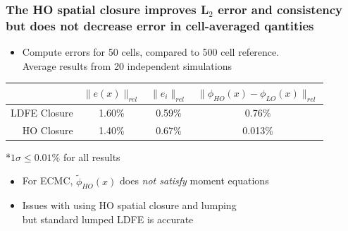 \documentclass[xcolor=dvipsnames,hyperref={pdfpagelabels=false},unknownkeysallowed]{beamer}
\newcommand{\colG}[1]{{\color{Gray!110} #1}}
\newlength{\wideitemsep}
\let\olditem\item
\renewcommand{\item}{\setlength{\itemsep}{\wideitemsep}\olditem}
\begin{document}
\begin{frame}
    \frametitle{The HO spatial closure improves L$_2$ error and consistency but does not
    decrease error in cell-averaged qantities}
    {\addtolength{\leftmargini}{-1.0cm}
        \fontsize{11.2}{12.0}\selectfont
    \begin{itemize}
\item Compute errors for 50 cells, compared to 500 cell reference. \\ \colG{Average results from 20 independent simulations}
    \end{itemize}
        \begin{table}
            \begin{center}
                \begin{tabular}{r|ccc} \cline{2-4}
          & \multicolumn{1}{|c}{$\|e(x)\|_{rel}$}  &
        \multicolumn{1}{c}{$\|e_i\|_{rel}$} & \multicolumn{1}{c}{$\|\phi_{HO}(x)
    -\phi_{LO}(x)\|_{rel}$} \\  \hline 
LDFE   Closure            &   1.60\%   &   0.59\%   &   0.76\%   \\
HO Closure        &   1.40\%  &   0.67\%     &   0.013\%  \\ \hline
    \end{tabular}
\end{center}
\colG{*$1\sigma \leq 0.01 \%$ for all results}
        \end{table}
    \begin{itemize}
            \pause
        \item For ECMC, $\tilde \phi_{HO}(x)$ does \emph{not satisfy} moment equations
        \item Issues with using HO spatial closure and lumping \\ \colG{but standard lumped LDFE is accurate}
    \end{itemize}
}
\end{frame}
\end{document}
